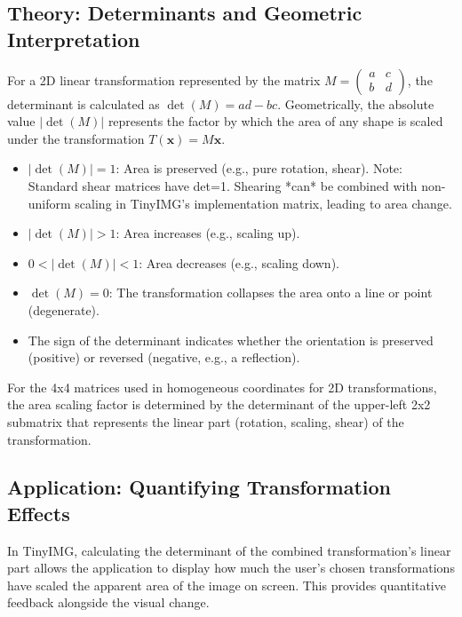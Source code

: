 \documentclass{article}
\begin{document}
\subsection{Theory: Determinants and Geometric Interpretation}
For a 2D linear transformation represented by the matrix $M = \begin{pmatrix} a & c \\ b & d \end{pmatrix}$, the determinant is calculated as $\det(M) = ad - bc$. Geometrically, the absolute value $|\det(M)|$ represents the factor by which the area of any shape is scaled under the transformation $T(\mathbf{x}) = M\mathbf{x}$.
\begin{itemize}
    \item $|\det(M)| = 1$: Area is preserved (e.g., pure rotation, shear). Note: Standard shear matrices have det=1. Shearing *can* be combined with non-uniform scaling in TinyIMG's implementation matrix, leading to area change.
    \item $|\det(M)| > 1$: Area increases (e.g., scaling up).
    \item $0 < |\det(M)| < 1$: Area decreases (e.g., scaling down).
    \item $\det(M) = 0$: The transformation collapses the area onto a line or point (degenerate).
    \item The sign of the determinant indicates whether the orientation is preserved (positive) or reversed (negative, e.g., a reflection).
\end{itemize}
For the 4x4 matrices used in homogeneous coordinates for 2D transformations, the area scaling factor is determined by the determinant of the upper-left 2x2 submatrix that represents the linear part (rotation, scaling, shear) of the transformation.

\subsection{Application: Quantifying Transformation Effects}
In TinyIMG, calculating the determinant of the combined transformation's linear part allows the application to display how much the user's chosen transformations have scaled the apparent area of the image on screen. This provides quantitative feedback alongside the visual change.
\end{document}
